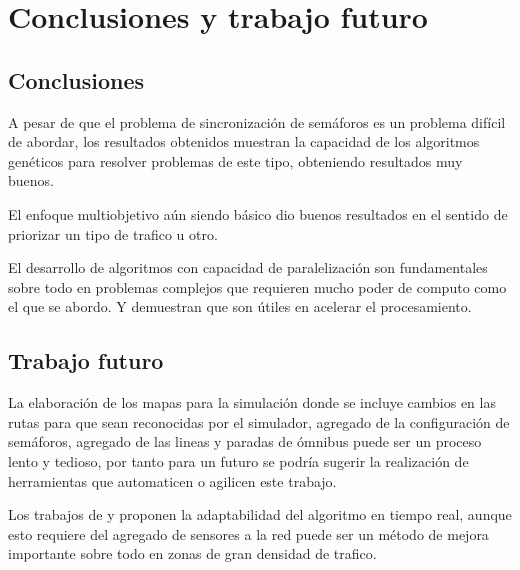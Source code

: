 \chapter{Conclusiones y trabajo futuro}

\section{Conclusiones}
A pesar de que el problema de sincronización de semáforos es un problema difícil de abordar, los resultados obtenidos
muestran la capacidad de los algoritmos genéticos para resolver problemas de este tipo, obteniendo resultados muy buenos. 

El enfoque multiobjetivo aún siendo básico dio buenos resultados en el sentido de priorizar un tipo de trafico u otro.

El desarrollo de algoritmos con capacidad de paralelización son fundamentales sobre  todo en problemas complejos que requieren mucho poder de computo como el que se abordo. Y demuestran que son útiles en acelerar el procesamiento.
\section{Trabajo futuro}

La elaboración de los mapas para la simulación donde se incluye cambios en las rutas para que sean reconocidas por el simulador, agregado de la configuración de semáforos, agregado de las lineas y paradas de ómnibus puede ser un proceso lento y tedioso, por tanto para un futuro se podría sugerir la realización de herramientas que automaticen o agilicen este trabajo.

Los trabajos de  \citep{Montana1996} y \citep{Vogel2000}  proponen la adaptabilidad del algoritmo en tiempo real, aunque esto requiere del agregado de sensores a la red puede ser un método de mejora importante sobre todo en zonas de gran densidad de trafico.
